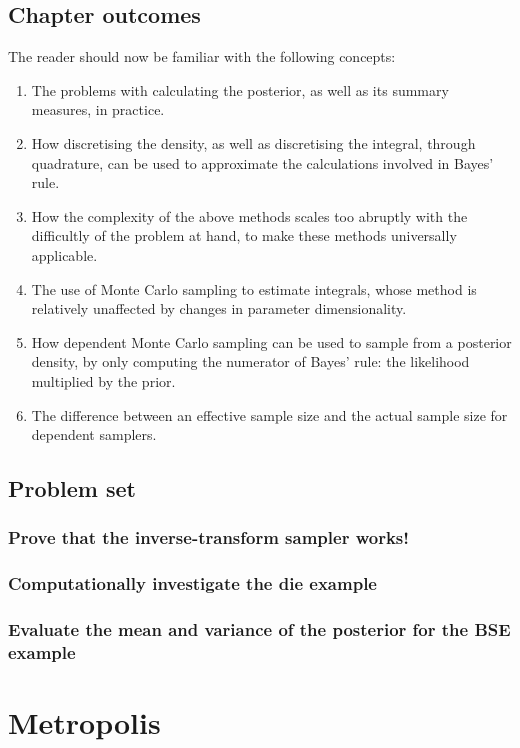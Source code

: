 \documentclass[11pt,fullpage]{book}
\begin{document}
\section{Chapter outcomes}
The reader should now be familiar with the following concepts:

\begin{enumerate}
\item The problems with calculating the posterior, as well as its summary measures, in practice.
\item How discretising the density, as well as discretising the integral, through quadrature, can be used to approximate the calculations involved in Bayes' rule. 
\item How the complexity of the above methods scales too abruptly with the difficultly of the problem at hand, to make these methods universally applicable.
\item The use of Monte Carlo sampling to estimate integrals, whose method is relatively unaffected by changes in parameter dimensionality.
\item How dependent Monte Carlo sampling can be used to sample from a posterior density, by only computing the numerator of Bayes' rule: the likelihood multiplied by the prior.
\item The difference between an effective sample size and the actual sample size for dependent samplers.
\end{enumerate}

\section{Problem set}
\subsection{Prove that the inverse-transform sampler works!}\label{prob:MCMC_inverseSamplerProof}
\subsection{Computationally investigate the die example}
\subsection{Evaluate the mean and variance of the posterior for the BSE example}\label{sec:MCMC_problemBSE}

\chapter{Metropolis}\label{chap:metropolisHastings}
\end{document}
